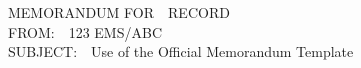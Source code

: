 \documentclass[12pt]{article}
\begin{document}
\noindent MEMORANDUM FOR~~RECORD \\
FROM:~~123 EMS/ABC \\
SUBJECT:~~Use of the Official Memorandum Template

\lipsum[1-2] %

\lipsum[3-10] %

\end{document}

